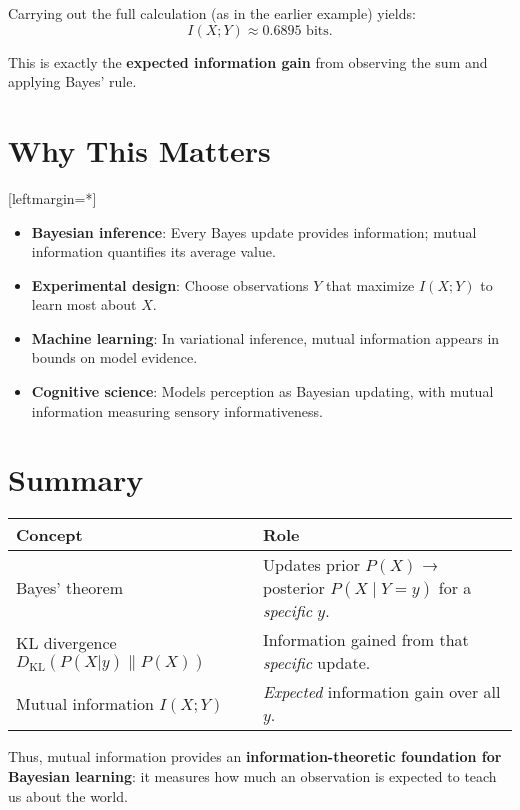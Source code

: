 \documentclass[11pt]{article}
\begin{document}
Carrying out the full calculation (as in the earlier example) yields:
\[
I(X;Y) \approx 0.6895 \text{ bits}.
\]

This is exactly the \textbf{expected information gain} from observing the sum and applying Bayes' rule.

\section*{Why This Matters}

[leftmargin=*]\begin{itemize}
    \item \textbf{Bayesian inference}: Every Bayes update provides information; mutual information quantifies its average value.
    \item \textbf{Experimental design}: Choose observations \(Y\) that maximize \(I(X;Y)\) to learn most about \(X\).
    \item \textbf{Machine learning}: In variational inference, mutual information appears in bounds on model evidence.
    \item \textbf{Cognitive science}: Models perception as Bayesian updating, with mutual information measuring sensory informativeness.
\end{itemize}

\section*{Summary}

\begin{center}
\begin{tabular}{ll}
\toprule
Concept & Role \\
\midrule
Bayes' theorem & Updates prior \(P(X)\) → posterior \(P(X \mid Y = y)\) for a \emph{specific} \(y\). \\
KL divergence \(D_{\mathrm{KL}}(P(X|y) \| P(X))\) & Information gained from that \emph{specific} update. \\
Mutual information \(I(X;Y)\) & \emph{Expected} information gain over all \(y\). \\
\bottomrule
\end{tabular}
\end{center}

Thus, mutual information provides an \textbf{information-theoretic foundation for Bayesian learning}: it measures how much an observation is expected to teach us about the world.
\end{document}
